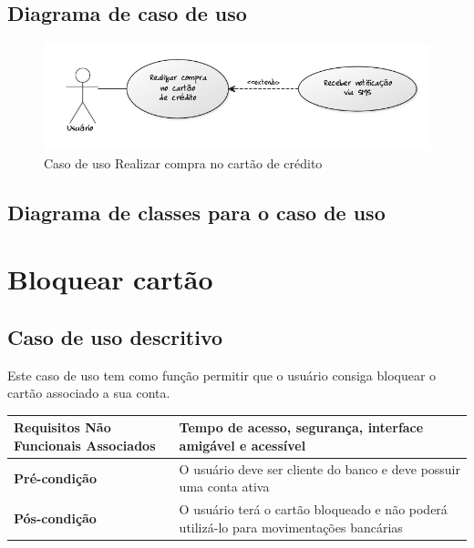 \subsection{Diagrama de caso de uso}

\begin{figure}[!htb]
     \centering
     \includegraphics[scale=0.6]{diagramas/caso-de-uso/imagens/realizarCompraCartao.png}
     \caption{Caso de uso Realizar compra no cartão de crédito}
\end{figure}

\subsection{Diagrama de classes para o caso de uso}

\section{Bloquear cartão}

\subsection{Caso de uso descritivo}

Este caso de uso tem como função permitir que o usuário consiga bloquear o cartão associado a sua conta.

\begin{table}[h]
  \centering
  \begin{tabular}{|p{4cm} | p{10cm} |}
      \hline
      \small{\textbf{Requisitos Não Funcionais Associados}}	&	Tempo de acesso, segurança, interface amigável e acessível	\\ \hline
      \small{\textbf{Pré-condição}}	&	O usuário deve ser cliente do banco e deve possuir uma conta ativa	\\ \hline
      \small{\textbf{Pós-condição}}	&	O usuário terá o cartão bloqueado e não poderá utilizá-lo para movimentações bancárias	\\ \hline
    \end{tabular}
\end{table}

